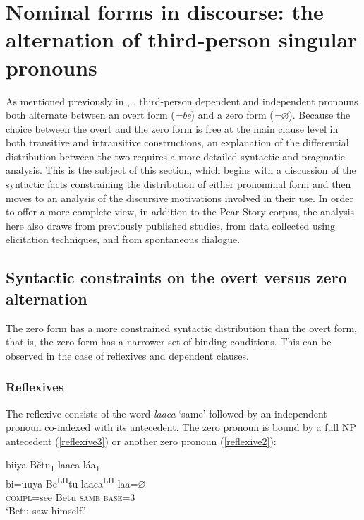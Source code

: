 \chapter[]{Nominal forms in discourse: the alternation of third-person singular pronouns}\label{alternation}
As mentioned previously in , , third-person dependent and independent pronouns both alternate between an overt form (\textit{=be}) and a zero form (\textit{=$\varnothing$}). Because the choice between the overt and the zero form is free at the main clause level in both transitive and intransitive constructions, an explanation of the differential distribution between the two requires a more detailed syntactic and pragmatic analysis. This is the subject of this section, which begins with a discussion of the syntactic facts constraining the distribution of either pronominal form and then moves to an analysis of the discursive motivations involved in their use. In order to offer a more complete view, in addition to the Pear Story corpus, the analysis here also draws from previously published studies, from data collected using elicitation techniques, and from spontaneous dialogue. 


\section{Syntactic constraints on the overt versus zero alternation}

The zero form has a more constrained syntactic distribution than the overt form, that is, the zero form has a narrower set of binding conditions. This can be observed in the case of reflexives and dependent clauses. 


\subsection{Reflexives}

The reflexive consists of the word \textit{laaca} `same' followed by an independent pronoun co-indexed with its antecedent. The zero pronoun is bound by a full NP antecedent (\ref{reflexive3}) or another zero pronoun (\ref{reflexive2}): 

\ea\label{reflexive3}
\glll biiya B\v{e}tu\textsubscript{1} laaca l\'{a}a\textsubscript{1} \\
bi=uuya Be\textsuperscript{LH}tu laaca\textsuperscript{LH} laa={$\varnothing$} \\
\textsc{compl}=see Betu \textsc{same} \textsc{base}=\textsc{3} \\
\glt `Betu saw himself.' 
\z

